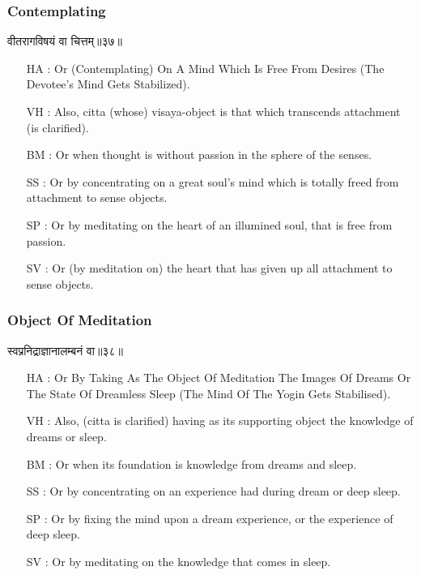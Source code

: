 \begin{frame}[fragile]\frametitle{Contemplating}
\begin{sanskrit}
वीतरागविषयं वा चित्तम्॥३७॥
\end{sanskrit}

	\begin{itemize}
	\item [HA]: Or (Contemplating) On A Mind Which Is Free From Desires (The Devotee’s Mind Gets Stabilized).
	\item [VH]: Also, citta (whose) visaya-object is that which transcends attachment (is clarified).
	\item [BM]: Or when thought is without passion in the sphere of the senses.
	\item [SS]: Or by concentrating on a great soul’s mind which is totally freed from attachment to sense objects.
	\item [SP]: Or by meditating on the heart of an illumined soul, that is free from passion.
	\item [SV]: Or (by meditation on) the heart that has given up all attachment to sense objects. 
	\end{itemize}
\end{frame}


\begin{frame}[fragile]\frametitle{Object Of Meditation}
\begin{sanskrit}
स्वप्ननिद्राज्ञानालम्बनं वा॥३८॥
\end{sanskrit}

	\begin{itemize}
	\item [HA]: Or By Taking As The Object Of Meditation The Images Of Dreams Or The State Of Dreamless Sleep (The Mind Of The Yogin Gets Stabilised).
	\item [VH]: Also, (citta is clarified) having as its supporting object the knowledge of dreams or sleep.
	\item [BM]: Or when its foundation is knowledge from dreams and sleep.
	\item [SS]: Or by concentrating on an experience had during dream or deep sleep.
	\item [SP]: Or by fixing the mind upon a dream experience, or the experience of deep sleep.
	\item [SV]: Or by meditating on the knowledge that comes in sleep. 
	\end{itemize}
\end{frame}



